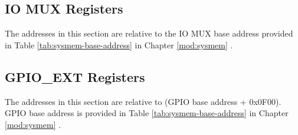 \documentclass[main\_\_EN.tex]{subfiles}
\begin{document}
\subsection{IO MUX Registers}
The addresses in this section are relative to the IO MUX base address provided in Table \ref{tab:sysmem-base-address} in Chapter \ref{mod:sysmem} \textit{}.


\subsection{GPIO\_EXT Registers}

The addresses in this section are relative to (GPIO base address + 0x0F00). GPIO base address is provided in Table \ref{tab:sysmem-base-address} in Chapter \ref{mod:sysmem} \textit{}.

\end{document}
